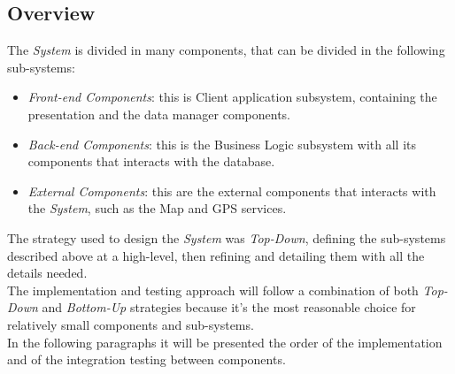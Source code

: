 \documentclass{article}
\begin{document}
	\subsection{Overview}
	The {\it System} is divided in many components, that can be divided in the following sub-systems:
	\begin{itemize}
		\item {\it Front-end Components}: this is Client application subsystem, containing the presentation and the data manager components.
		\item {\it Back-end Components}: this is the Business Logic subsystem with all its components that interacts with the database. 
		\item {\it External Components}: this are the external components that interacts with the {\it System}, such as the Map and GPS services.  
	\end{itemize}
	The strategy used to design the {\it System} was {\it Top-Down}, defining the sub-systems described above at a high-level, then refining and detailing them with all the details needed.\\
	The implementation and testing approach will follow a combination of both {\it Top-Down} and {\it Bottom-Up} strategies because it's the most reasonable choice for relatively small components and sub-systems. \\ 
	In the following paragraphs it will be presented the order of the implementation and of the integration testing between components.
		
\end{document}
